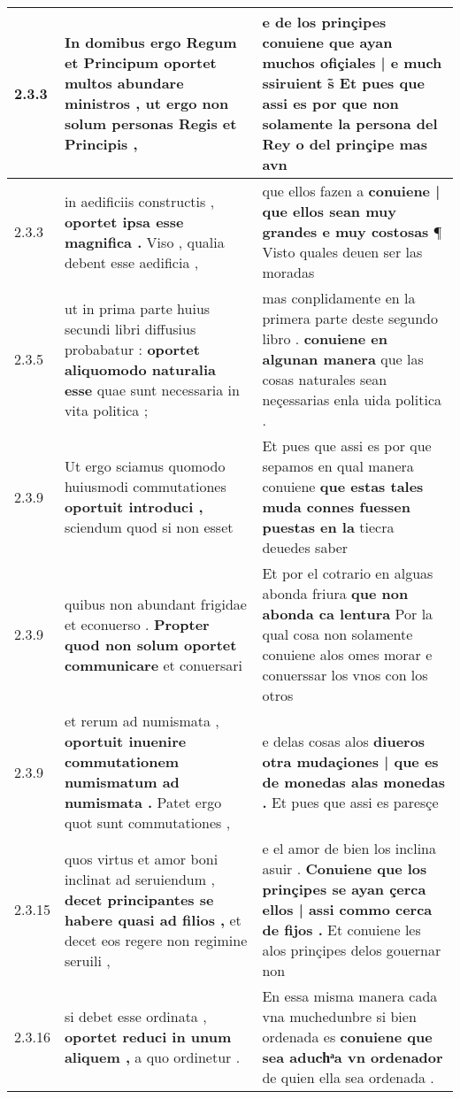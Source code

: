 \begin{tabular}{|p{1cm}|p{6.5cm}|p{6.5cm}|}
2.3.3 & In domibus ergo Regum et Principum \textbf{ oportet multos abundare ministros , } ut ergo non solum personas Regis et Principis , & e de los prinçipes conuiene \textbf{ que ayan muchos ofiçiales | e much ssiruient s̃ Et pues que assi es } por que non solamente la persona del Rey o del prinçipe mas avn \\\hline
2.3.3 & in aedificiis constructis , \textbf{ oportet ipsa esse magnifica . } Viso , qualia debent esse aedificia , & que ellos fazen a \textbf{ conuiene | que ellos sean muy grandes e muy costosas } ¶ Visto quales deuen ser las moradas \\\hline
2.3.5 & ut in prima parte huius secundi libri diffusius probabatur : \textbf{ oportet aliquomodo naturalia esse } quae sunt necessaria in vita politica ; & mas conplidamente en la primera parte deste segundo libro . \textbf{ conuiene en algunan manera } que las cosas naturales sean neçessarias enla uida politica . \\\hline
2.3.9 & Ut ergo sciamus quomodo huiusmodi commutationes \textbf{ oportuit introduci , } sciendum quod si non esset & Et pues que assi es por que sepamos en qual manera conuiene \textbf{ que estas tales muda connes fuessen puestas en la } tiecra deuedes saber \\\hline
2.3.9 & quibus non abundant frigidae et econuerso . \textbf{ Propter quod non solum oportet communicare } et conuersari & Et por el cotrario en alguas abonda friura \textbf{ que non abonda ca lentura } Por la qual cosa non solamente conuiene alos omes morar e conuerssar los vnos con los otros \\\hline
2.3.9 & et rerum ad numismata , \textbf{ oportuit inuenire commutationem numismatum ad numismata . } Patet ergo quot sunt commutationes , & e delas cosas alos \textbf{ diueros otra mudaçiones | que es de monedas alas monedas . } Et pues que assi es paresçe \\\hline
2.3.15 & quos virtus et amor boni inclinat ad seruiendum , \textbf{ decet principantes se habere quasi ad filios , } et decet eos regere non regimine seruili , & e el amor de bien los inclina asuir . \textbf{ Conuiene que los prinçipes se ayan çerca ellos | assi commo cerca de fijos . } Et conuiene les alos prinçipes delos gouernar non \\\hline
2.3.16 & si debet esse ordinata , \textbf{ oportet reduci in unum aliquem , } a quo ordinetur . & En essa misma manera cada vna muchedunbre si bien ordenada es \textbf{ conuiene que sea aduchͣa vn ordenador } de quien ella sea ordenada . \\\hline

\end{tabular}
